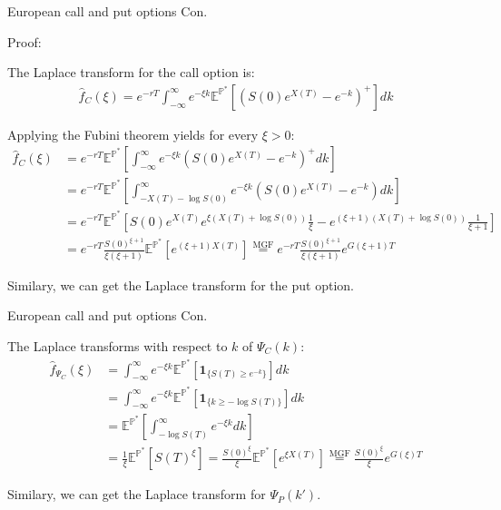 \documentclass{beamer}
\begin{document}
\begin{frame}{European call and put options Con.}

    {\footnotesize \scriptsize
    \par Proof:
    \par The Laplace transform for the call option is:
    \begin{align*}
        \hat{f}_C(\xi) = e^{-rT} \int_{-\infty}^{\infty} e^{-\xi k} \mathbb{E}^{\mathbb{P}^*} \left[ (S(0)e^{X(T)} - e^{-k})^+ \right]  dk
    \end{align*}
    \par Applying the Fubini theorem yields for every \(\xi > 0\):
    \begin{align*}
        \hat{f}_C(\xi) &= e^{-rT} \mathbb{E}^{\mathbb{P}^*} \left[ \int_{-\infty}^{\infty} e^{-\xi k} \left( S(0)e^{X(T)} - e^{-k} \right)^+  dk \right]\\
        &= e^{-rT} \mathbb{E}^{\mathbb{P}^*} \left[ \int_{-X(T)-\log S(0)}^{\infty} e^{-\xi k} \left( S(0)e^{X(T)} - e^{-k} \right)  dk \right]\\
        &= e^{-rT} \mathbb{E}^{\mathbb{P}^*} \left[ S(0)e^{X(T)} e^{\xi (X(T)+\log S(0))} \frac{1}{\xi} - e^{(\xi+1)(X(T)+\log S(0))} \frac{1}{\xi+1} \right]\\
        &= e^{-rT} \frac{S(0)^{\xi+1}}{\xi (\xi+1)} \mathbb{E}^{\mathbb{P}^*} \left[ e^{(\xi+1)X(T)} \right] \overset{\text{MGF}}{=}
          e^{-rT} \frac{S(0)^{\xi+1}}{\xi (\xi+1)} e^{G(\xi+1)T}
    \end{align*}
    
    \par Similary, we can get the  Laplace transform for the put option. 
    }
    
\end{frame}
\begin{frame}{European call and put options Con.}

    {\footnotesize \scriptsize
    \par  The Laplace transforms with respect to \( k \) of \( \Psi_C(k) \):
    \begin{align*}
        \hat{f}_{\Psi_C}(\xi) &= \int_{-\infty}^{\infty} e^{-\xi k} \mathbb{E}^ {\mathbb{P}^*} \left[ \mathbf{1}_{\{S(T) \geq e^{-k}\}} \right]  dk \\
       &  = \int_{-\infty}^{\infty} e^{-\xi k} \mathbb{E}^{\mathbb{P}^*} \left[ \mathbf{1}_{\{k \geq -\log S(T)\}} \right]  dk\\
       & =\mathbb{E}^{\mathbb{P}^*} \left[ \int_{-\log S(T)}^{\infty} e^{-\xi k}  dk \right] \\
       &= \frac{1}{\xi} \mathbb{E}^{\mathbb{P}^*} \left[ S(T)^{\xi} \right] = 
       \frac{S(0)^{\xi}}{\xi} \mathbb{E}^{\mathbb{P}^*} \left[ e^{\xi X(T)} \right] \overset{\text{MGF}}{=} \frac{S(0)^{\xi}}{\xi} e^{G(\xi)T}
    \end{align*}
    \par Similary, we can get the  Laplace transform for $\Psi_P(k')$. 
    }
    
\end{frame}
\end{document}
